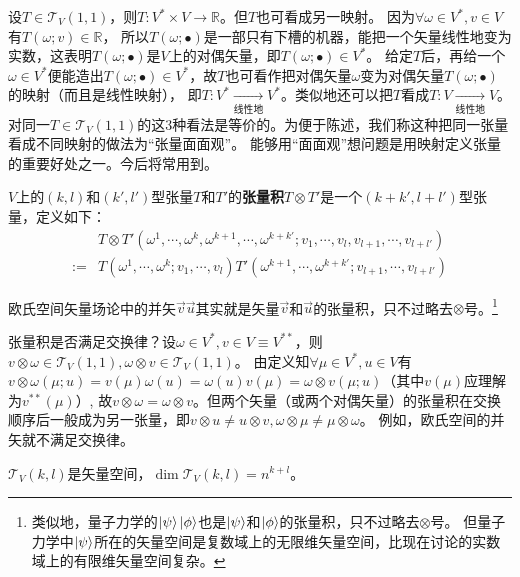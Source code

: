 设$T \in \mathscr{T}_V(1, 1)$，则$T \colon V^* \times V \to \mathbb{R}$。但$T$也可看成另一映射。
因为$\forall \omega \in V^*, v \in V$有$T(\omega; v) \in \mathbb{R}$，
所以$T(\omega; \bullet)$是一部只有下槽的机器，能把一个矢量线性地变为实数，这表明$T(\omega; \bullet)$是$V$上的对偶矢量，即$T(\omega; \bullet) \in V^*$。
给定$T$后，再给一个$\omega \in V^*$便能造出$T(\omega; \bullet) \in V^*$，故$T$也可看作把对偶矢量$\omega$变为对偶矢量$T(\omega; \bullet)$的映射（而且是线性映射），
即$T \colon V^* \xrightarrow[\text{线性地}]{} V^*$。类似地还可以把$T$看成$T \colon V \xrightarrow[\text{线性地}]{} V$。
对同一$T \in \mathscr{T}_V(1, 1)$的这$3$种看法是等价的。为便于陈述，我们称这种把同一张量看成不同映射的做法为``张量面面观''。
能够用``面面观''想问题是用映射定义张量的重要好处之一。今后将常用到。

\begin{definition}
$V$上的$(k, l)$和$(k', l')$型张量$T$和$T'$的\textbf{张量积}$T \otimes T'$是一个$(k + k', l + l')$型张量，定义如下：
$$\begin{aligned}
& T \otimes T'(\omega^1, \cdots, \omega^k, \omega^{k + 1}, \cdots, \omega^{k + k'}; v_1, \cdots, v_l, v_{l + 1}, \cdots, v_{l + l'}) \\
:= & T(\omega^1, \cdots, \omega^k; v_1, \cdots, v_l)T'(\omega^{k + 1}, \cdots, \omega^{k + k'}; v_{l + 1}, \cdots, v_{l + l'})
\end{aligned}$$
\end{definition}

欧氏空间矢量场论中的并矢$\vec{v}\vec{u}$其实就是矢量$\vec{v}$和$\vec{u}$的张量积，只不过略去$\otimes$号。\footnote{
类似地，量子力学的$\ket{\psi}\ket{\phi}$也是$\ket{\psi}$和$\ket{\phi}$的张量积，只不过略去$\otimes$号。
但量子力学中$\ket{\psi}$所在的矢量空间是复数域上的无限维矢量空间，比现在讨论的实数域上的有限维矢量空间复杂。
}

张量积是否满足交换律？设$\omega \in V^*, v \in V \equiv V^{**}$，则$v \otimes \omega \in \mathscr{T}_V(1, 1), \omega \otimes v \in \mathscr{T}_V(1, 1)$。
由定义知$\forall \mu \in V^*, u \in V$有$v \otimes \omega(\mu; u) = v(\mu)\omega(u) = \omega(u)v(\mu) = \omega \otimes v(\mu; u)$（其中$v(\mu)$应理解为$v^{**}(\mu)$）,
故$v \otimes \omega = \omega \otimes v$。但两个矢量（或两个对偶矢量）的张量积在交换顺序后一般成为另一张量，即$v \otimes u \neq u \otimes v, \omega \otimes \mu \neq \mu \otimes \omega$。
例如，欧氏空间的并矢就不满足交换律。

\begin{theorem}
$\mathscr{T}_V(k, l)$是矢量空间，$\dim\mathscr{T}_V(k, l) = n^{k + l}$。
\end{theorem}

